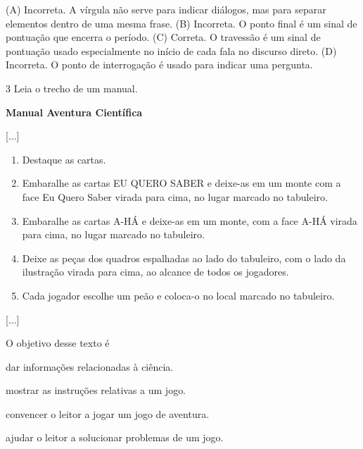 
(A) Incorreta. A vírgula não serve para indicar diálogos, mas para
separar elementos dentro de uma mesma frase.
(B) Incorreta. O ponto final é um sinal de pontuação que encerra o
período.
(C) Correta. O travessão é um sinal de pontuação usado especialmente no
início de cada fala no discurso direto.
(D) Incorreta. O ponto de interrogação é usado para indicar uma
pergunta.

\num{3} Leia o trecho de um manual.

\textbf{Manual Aventura Científica}

{[}...{]}

\begin{enumerate}
\item Destaque as cartas.
\item Embaralhe as cartas EU QUERO SABER e deixe-as em um monte com a
face Eu Quero Saber virada para cima, no lugar marcado no tabuleiro.
\item Embaralhe as cartas A-HÁ e deixe-as em um monte, com a face A-HÁ
virada para cima, no lugar marcado no tabuleiro.
\item Deixe as peças dos quadros espalhadas ao lado do tabuleiro, com o
lado da ilustração virada para cima, ao alcance de todos os jogadores.
\item Cada jogador escolhe um peão e coloca-o no local marcado no
tabuleiro.
\end{enumerate}

{[}...{]}


O objetivo desse texto é

\begin{escolha}
\item dar informações relacionadas à ciência.

\item mostrar as instruções relativas a um jogo.

\item convencer o leitor a jogar um jogo de aventura.

\item ajudar o leitor a solucionar problemas de um jogo.
\end{escolha}

